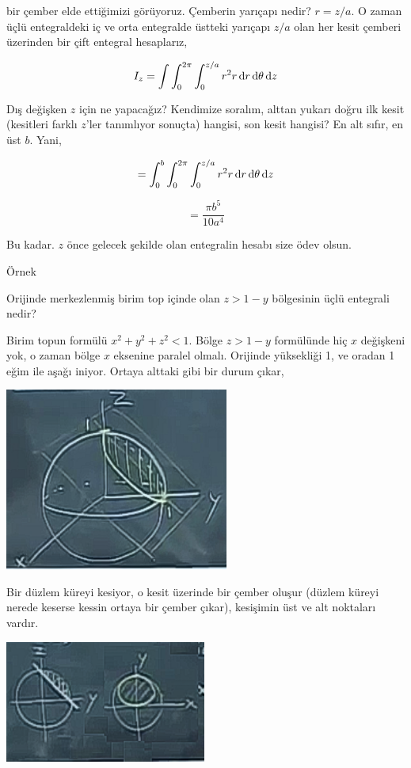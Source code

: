 \documentclass[12pt,fleqn]{article}\usepackage{../../common}
\begin{document}
bir çember elde ettiğimizi görüyoruz. Çemberin yarıçapı nedir? $r = z/a$. O
zaman üçlü entegraldeki iç ve orta entegralde üstteki yarıçapı $z/a$ olan
her kesit çemberi üzerinden bir çift entegral hesaplarız,

$$ 
I_z = \int \int_{0}^{2\pi} \int_{0}^{z/a} r^2 r \,\mathrm{d} r \,\mathrm{d} \theta \,\mathrm{d} z
$$

Dış değişken $z$ için ne yapacağız? Kendimize soralım, alttan yukarı doğru
ilk kesit (kesitleri farklı $z$'ler tanımlıyor sonuçta) hangisi, son kesit
hangisi? En alt sıfır, en üst $b$. Yani,

$$ 
 = \int_{0}^{b} \int_{0}^{2\pi} \int_{0}^{z/a} r^2 r \,\mathrm{d} r \,\mathrm{d} \theta \,\mathrm{d} z
$$

$$ = \frac{\pi b^5}{10 a^4}$$

Bu kadar. $z$ önce gelecek şekilde olan entegralin hesabı size ödev olsun. 

Örnek

Orijinde merkezlenmiş birim top içinde olan $z > 1-y$ bölgesinin üçlü
entegrali nedir? 

Birim topun formülü $x^2 + y^2 + z^2 < 1$. Bölge $z > 1-y$ formülünde hiç
$x$ değişkeni yok, o zaman bölge $x$ eksenine paralel olmalı. Orijinde
yüksekliği 1, ve oradan 1 eğim ile aşağı iniyor. Ortaya alttaki gibi bir
durum çıkar,

\includegraphics[height=6cm]{25_13.png}

Bir düzlem küreyi kesiyor, o kesit üzerinde bir çember oluşur (düzlem
küreyi nerede keserse kessin ortaya bir çember çıkar), kesişimin üst ve alt
noktaları vardır. 

\includegraphics[height=4cm]{25_14.png}
\end{document}
